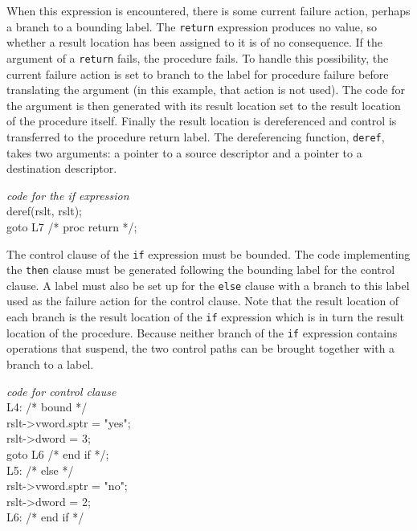 
\noindent
When this expression is encountered, there is some current failure
action, perhaps a branch to a bounding label. The \texttt{return}
expression produces no value, so whether a result location has been
assigned to it is of no consequence. If the argument of a
\texttt{return} fails, the procedure fails. To handle this
possibility, the current failure action is set to branch to the label
for procedure failure before translating the argument (in this
example, that action is not used).  The code for the argument is then
generated with its result location set to the result location of the
procedure itself. Finally the result location is dereferenced and
control is transferred to the procedure return label. The
dereferencing function, \texttt{deref}, takes two arguments: a pointer
to a source descriptor and a pointer to a destination descriptor.

\goodbreak
\begin{iconcode}
\>\>\textit{code for the if expression }\\
\>\>deref(rslt, rslt);\\
\>\>goto L7 /* proc return */;\\
\end{iconcode}


The control clause of the \texttt{if} expression must be bounded. The
code implementing the \texttt{then} clause must be generated following
the bounding label for the control clause. A label must also be set up
for the \texttt{else} clause with a branch to this label used as the
failure action for the control clause. Note that the result location
of each branch is the result location of the \texttt{if} expression
which is in turn the result location of the procedure. Because neither
branch of the \texttt{if} expression contains operations that suspend,
the two control paths can be brought together with a branch to a
label.

\goodbreak
\begin{iconcode}
\>\>\textit{code for control clause}\\
\>L4: /* bound */\\
\>\>rslt->vword.sptr = "yes";\\
\>\>rslt->dword = 3;\\
\>\>goto L6 /* end if */;\\
\>L5: /* else */\\
\>\>rslt->vword.sptr = "no";\\
\>\>rslt->dword = 2;\\
\>L6: /* end if */\\
\end{iconcode}

